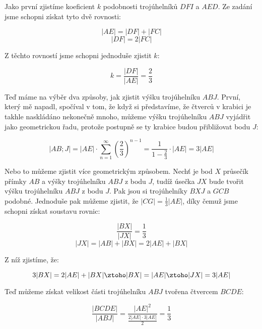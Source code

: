 \documentclass{fkssolpub}
\author{Ondřej Sedláček}
\begin{document}
Jako první zjistíme koeficient $k$ podobnosti trojúhelníků $DFI$ a $AED$. Ze zadání
jsme schopni získat tyto dvě rovnosti:

\[
	|AE| = |DF| + |FC|
\]
\[
	|DF| = 2 |FC|
\]

Z těchto rovností jsme schopni jednoduše zjistit $k$:

\[
	k = \frac{|DF|}{|AE|} = \frac{2}{3}
\]

Teď máme na výběr dva způsoby, jak zjistit výšku trojúhelníku $ABJ$. První,
který mě napadl, spočíval v tom, že když si představíme, že čtverců v krabici
je takhle naskládáno nekonečně mnoho, můžeme výšku trojúhelníku $ABJ$ vyjádřit
jako geometrickou řadu, protože postupně se ty krabice budou přibližovat bodu $J$:

\[
	|AB;J| = |AE| \cdot \sum^{\infty}_{n=1} \left(\frac{2}{3}\right)^{n-1}
	= \frac{1}{1 - \frac{2}{3}} \cdot |AE| = 3 |AE|
\]

Nebo to můžeme zjistit více geometrickým způsobem. Nechť je bod $X$ průsečík
přímky $AB$ a výšky trojúhelníku $ABJ$ z bodu $J$, tudíž úsečka $JX$ bude
tvořit výšku trojúhelníku $ABJ$ z bodu $J$. Pak jsou si trojúhelníky
$BXJ$ a $GCB$ podobné. Jednoduše pak můžeme zjistit, že $|CG| = \frac{1}{3}|AE|$,
díky čemuž jsme schopni získat soustavu rovnic:

\[
	\frac{|BX|}{|JX|} = \frac{1}{3}
\]
\[
	|JX| = |AB| + |BX| = 2|AE| + |BX|
\]

Z níž zjistíme, že:

\[
	3 |BX| = 2 |AE| + |BX| \ztoho |BX| = |AE| \ztoho |JX| = 3 |AE|
\]

Teď můžeme získat velikost části trojúhelníku $ABJ$ tvořena čtvercem $BCDE$:

\[
	\frac{|BCDE|}{|ABJ|} = \frac{|AE|^2}{\frac{2|AE| \cdot 3 |AE|}{2}} = \frac{1}{3}
\]
\end{document}
